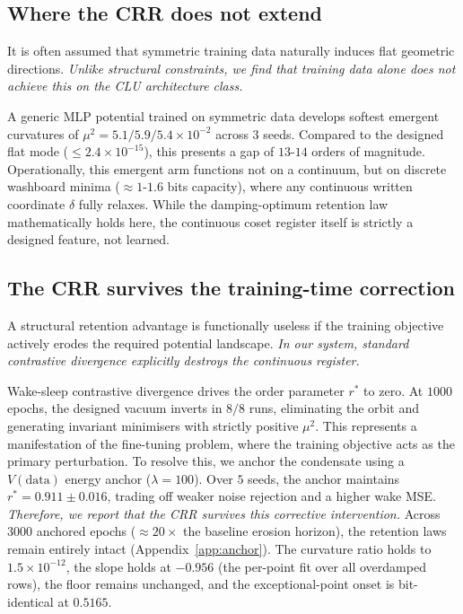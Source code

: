 \documentclass[mlabstract,onecolumn]{jmlr}
\begin{document}
\subsection{Where the CRR does not extend}\label{sec:boundary}

It is often assumed that symmetric training data naturally induces flat geometric directions. \emph{Unlike structural constraints, we find that training data alone does not achieve this on the CLU architecture class.}

A generic MLP potential trained on symmetric data develops softest emergent curvatures of $\mu^2=5.1/5.9/5.4\!\times\!10^{-2}$ across $3$ seeds. Compared to the designed flat mode ($\le2.4\!\times\!10^{-15}$), this presents a gap of $13$-$14$ orders of magnitude. Operationally, this emergent arm functions not on a continuum, but on discrete washboard minima ($\approx1$-$1.6$ bits capacity), where any continuous written coordinate $\delta$ fully relaxes. While the damping-optimum retention law mathematically holds here, the continuous coset register itself is strictly a designed feature, not learned.

\subsection{The CRR survives the training-time correction}\label{sec:cure}

A structural retention advantage is functionally useless if the training objective actively erodes the required potential landscape. \emph{In our system, standard contrastive divergence explicitly destroys the continuous register.}

Wake-sleep contrastive divergence drives the order parameter $r^*$ to zero. At $1000$ epochs, the designed vacuum inverts in $8/8$ runs, eliminating the orbit and generating invariant minimisers with strictly positive $\mu^2$. This represents a manifestation of the fine-tuning problem, where the training objective acts as the primary perturbation. To resolve this, we anchor the condensate using a $V(\text{data})$ energy anchor ($\lambda=100$). Over $5$ seeds, the anchor maintains $r^*=0.911\pm0.016$, trading off weaker noise rejection and a higher wake MSE. \emph{Therefore, we report that the CRR survives this corrective intervention.} Across $3000$ anchored epochs ($\approx20\times$ the baseline erosion horizon), the retention laws remain entirely intact (Appendix~\ref{app:anchor}). The curvature ratio holds to $1.5\!\times\!10^{-12}$, the slope holds at $-0.956$ (the per-point fit over all overdamped rows), the floor remains unchanged, and the exceptional-point onset is bit-identical at $0.5165$.
\end{document}
